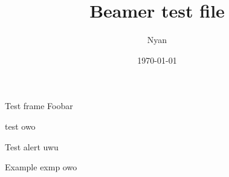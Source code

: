 \documentclass{xuan}
\title{Beamer test file}
\author{Nyan}
\date\today
\begin{document}
\maketitle
\begin{frame}{Test frame}
Foobar
\begin{block}{test}
owo
\end{block}
\begin{alertblock}{Test alert}
uwu
\end{alertblock}
\begin{exampleblock}{Example}
exmp owo
\end{exampleblock}
\end{frame}
\end{document}
